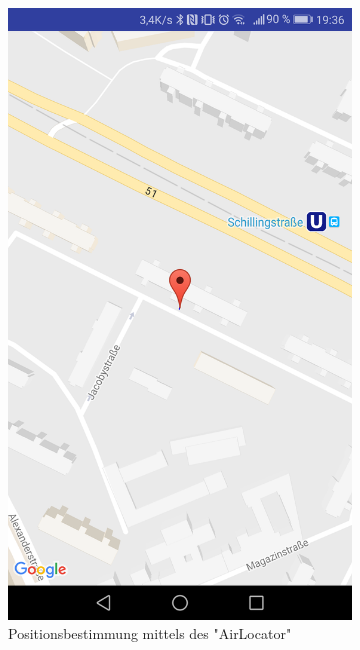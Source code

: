 \documentclass[11pt,a4paper]{article}
\begin{document}
\begin{figure}[htbp]
    \centering
        \begin{subfigure}[htbp]{0.38\textwidth}
        \includegraphics[width=\textwidth]{pics/screenshots/AirLocator_Single_Pos.png}
        \caption{Positionsbestimmung mittels des "AirLocator"}
        \label{fig:AirLocator_Single_Pos}
    \end{subfigure}
    \begin{subfigure}[htbp]{0.38\textwidth}

\end{subfigure}
\end{figure}
\end{document}

